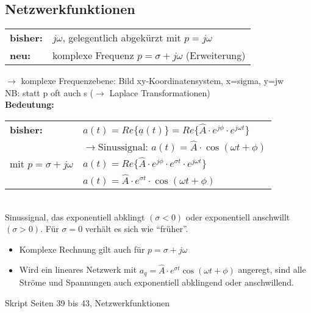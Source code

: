 \subsection{Netzwerkfunktionen}
\begin{tabular}{ll}
	\textbf{bisher:} & $j\omega$, gelegentlich abgekürzt mit $p=j\omega$ \\
	\textbf{neu:} & komplexe Frequenz $p=\sigma + j \omega$ (Erweiterung) \\
\end{tabular}
$\rightarrow$ komplexe Frequenzebene: Bild xy-Koordinatensystem, x=sigma, y=jw\\
NB: statt p oft auch s ($\rightarrow$ Laplace Transformationen)\\
\textbf{Bedeutung:}\\
\begin{tabular}{ll}
	\textbf{bisher:} & $a(t)=Re\{\underline{a}(t)\}=Re\{\hat{A}\cdot e^{j\phi}\cdot
	e^{j\omega t}\}$ \\
	& $\rightarrow \text{Sinussignal: } a(t)=\hat{A}\cdot\cos{\left(\omega t +
	\phi\right)}$\\ mit $p=\sigma+j\omega$ & $a(t)=Re\{\hat{A}\cdot e^{j\phi}\cdot
	e^{\sigma t}\cdot e^{j\omega t}\}$\\
	& $a(t)=\hat{A}\cdot e^{\sigma t} \cdot \cos{\left(\omega t + \phi\right)}$\\
\end{tabular}\\
Sinussignal, das exponentiell abklingt $(\sigma < 0)$ oder exponentiell
anschwillt $(\sigma > 0)$. Für $\sigma = 0$ verhält es sich wie "`früher"'.\\
\begin{itemize}
  \item Komplexe Rechnung gilt auch für $p=\sigma+j\omega$\\
  \item Wird ein lineares Netzwerk mit $a_q=\hat{A}\cdot e^{\sigma t}
  \cos\left(\omega t + \phi\right)$ angeregt, sind alle Ströme und Spannungen
  auch exponentiell abklingend oder anschwillend.
\end{itemize}
Skript Seiten 39 bis 43, Netzwerkfunktionen

